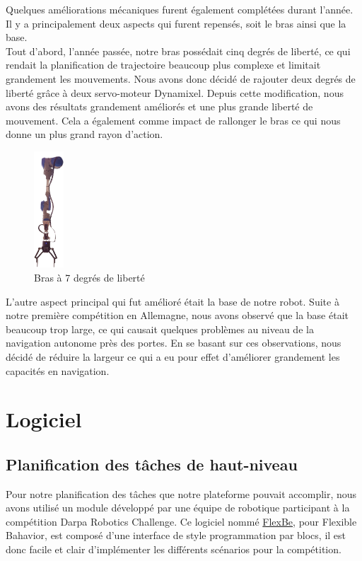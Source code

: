 \documentclass[runningheads,a4paper]{llncs}
\begin{document}
Quelques améliorations mécaniques furent également complétées durant l'année. Il y a principalement deux aspects qui furent repensés, soit le bras ainsi que la base.\\

Tout d'abord, l'année passée, notre bras possédait cinq degrés de liberté, ce qui rendait la planification de trajectoire beaucoup plus complexe et limitait grandement les mouvements. Nous avons donc décidé de rajouter deux degrés de liberté grâce à deux servo-moteur Dynamixel. Depuis cette modification, nous avons des résultats grandement améliorés et une plus grande liberté de mouvement. Cela a également comme impact de rallonger le bras ce qui nous donne un plus grand rayon d'action.\\

\begin{figure}
	\centering
	\includegraphics[width=0.10\textwidth]{images/arm.png}
	\caption{Bras à 7 degrés de liberté}
\end{figure}

L'autre aspect principal qui fut amélioré était la base de notre robot. Suite à notre première compétition en Allemagne, nous avons observé que la base était beaucoup trop large, ce qui causait quelques problèmes au niveau de la navigation autonome près des portes. En se basant sur ces observations, nous décidé de réduire la largeur ce qui a eu pour effet d'améliorer grandement les capacités en navigation. \\
\newpage
\section{Logiciel}

\subsection{Planification des tâches de haut-niveau}
Pour notre planification des tâches que notre plateforme pouvait accomplir, nous avons utilisé un module développé par une équipe de robotique participant à la compétition Darpa Robotics Challenge. Ce logiciel nommé \href{http://philserver.bplaced.net/fbe/index.php}{FlexBe}\cite{schillinger2016flexbe}, pour Flexible Bahavior, est composé d'une interface de style programmation par blocs, il est donc facile et clair d'implémenter les différents scénarios pour la compétition.\\
\end{document}
